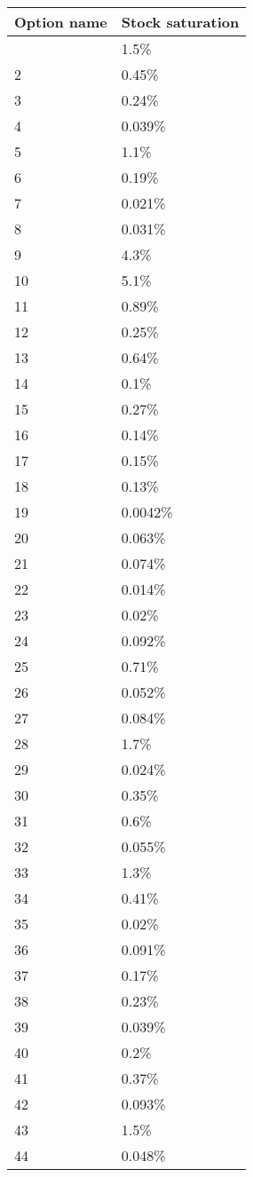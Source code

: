 \begin{longtable}[]{@{}ll@{}}
\toprule\noalign{}
Option name & Stock saturation \\
\midrule\noalign{}
\endhead
\bottomrule\noalign{}
\endlastfoot
1 & 1.5\% \\
2 & 0.45\% \\
3 & 0.24\% \\
4 & 0.039\% \\
5 & 1.1\% \\
6 & 0.19\% \\
7 & 0.021\% \\
8 & 0.031\% \\
9 & 4.3\% \\
10 & 5.1\% \\
11 & 0.89\% \\
12 & 0.25\% \\
13 & 0.64\% \\
14 & 0.1\% \\
15 & 0.27\% \\
16 & 0.14\% \\
17 & 0.15\% \\
18 & 0.13\% \\
19 & 0.0042\% \\
20 & 0.063\% \\
21 & 0.074\% \\
22 & 0.014\% \\
23 & 0.02\% \\
24 & 0.092\% \\
25 & 0.71\% \\
26 & 0.052\% \\
27 & 0.084\% \\
28 & 1.7\% \\
29 & 0.024\% \\
30 & 0.35\% \\
31 & 0.6\% \\
32 & 0.055\% \\
33 & 1.3\% \\
34 & 0.41\% \\
35 & 0.02\% \\
36 & 0.091\% \\
37 & 0.17\% \\
38 & 0.23\% \\
39 & 0.039\% \\
40 & 0.2\% \\
41 & 0.37\% \\
42 & 0.093\% \\
43 & 1.5\% \\
44 & 0.048\% \\

\end{longtable}
